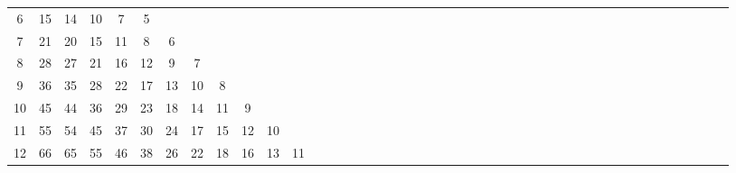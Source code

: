 \documentclass[12pt,a4paper]{amsart}
\theoremstyle{definition} %
\theoremstyle{plain} %
\begin{document}
\begin{table}[h]
{\begin{tabular}{|c|*{44}{c|}}
             6 &  15 &  14 &  10 &   7 &   5 &     &     &     &     &     &     &     &     &     &     &     &     &     &     &     &     &     &     &     &     &     &     &    &    &    &    &             &             &             &             &             &             &             &             &             &             &             &             &             \\
             7 &  21 &  20 &  15 &  11 &   8 &   6 &     &     &     &     &     &     &     &     &     &     &     &     &     &     &     &     &     &     &     &     &     &    &    &    &    &             &             &             &             &             &             &             &             &             &             &             &             &             \\
             8 &  28 &  27 &  21 &  16 &  12 &   9 &   7 &     &     &     &     &     &     &     &     &     &     &     &     &     &     &     &     &     &     &     &     &    &    &    &    &             &             &             &             &             &             &             &             &             &             &             &             &             \\
             9 &  36 &  35 &  28 &  22 &  17 &  13 &  10 &   8 &     &     &     &     &     &     &     &     &     &     &     &     &     &     &     &     &     &     &     &    &    &    &    &             &             &             &             &             &             &             &             &             &             &             &             &             \\
            10 &  45 &  44 &  36 &  29 &  23 &  18 &  14 &  11 &   9 &     &     &     &     &     &     &     &     &     &     &     &     &     &     &     &     &     &     &    &    &    &    &             &             &             &             &             &             &             &             &             &             &             &             &             \\
            11 &  55 &  54 &  45 &  37 &  30 &  24 &  17 &  15 &  12 &  10 &     &     &     &     &     &     &     &     &     &     &     &     &     &     &     &     &     &    &    &    &    &             &             &             &             &             &             &             &             &             &             &             &             &             \\
            12 &  66 &  65 &  55 &  46 &  38 &  26 &  22 &  18 &  16 &  13 &  11 &     &     &     &     &     &     &     &     &     &     &     &     &     &     &     &     &    &    &    &    &             &             &             &             &             &             &             &             &             &             &             &             &             \\

\end{tabular}}
\end{table}
\end{document}
